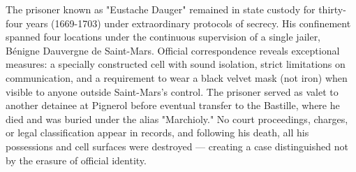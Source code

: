 The prisoner known as "Eustache Dauger" remained in state custody for thirty-four years (1669-1703) under extraordinary protocols of secrecy. His confinement spanned four locations under the continuous supervision of a single jailer, Bénigne Dauvergne de Saint-Mars. Official correspondence reveals exceptional measures: a specially constructed cell with sound isolation, strict limitations on communication, and a requirement to wear a black velvet mask (not iron) when visible to anyone outside Saint-Mars's control. The prisoner served as valet to another detainee at Pignerol before eventual transfer to the Bastille, where he died and was buried under the alias "Marchioly." No court proceedings, charges, or legal classification appear in records, and following his death, all his possessions and cell surfaces were destroyed — creating a case distinguished not by the erasure of official identity.
